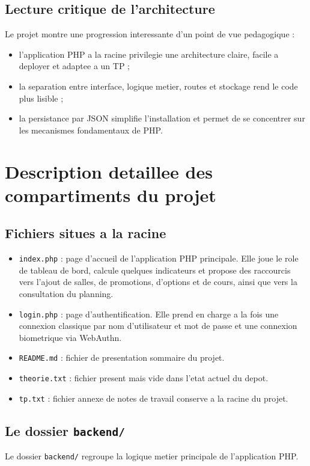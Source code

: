 \documentclass[12pt,a4paper]{article}
\begin{document}
\subsection{Lecture critique de l'architecture}
Le projet montre une progression interessante d'un point de vue pedagogique :
\begin{itemize}
    \item l'application PHP a la racine privilegie une architecture claire, facile a deployer et adaptee a un TP ;
    \item la separation entre interface, logique metier, routes et stockage rend le code plus lisible ;
    \item la persistance par JSON simplifie l'installation et permet de se concentrer sur les mecanismes fondamentaux de PHP.
\end{itemize}

\section{Description detaillee des compartiments du projet}
\subsection{Fichiers situes a la racine}
\begin{itemize}
    \item \texttt{index.php} : page d'accueil de l'application PHP principale. Elle joue le role de tableau de bord, calcule quelques indicateurs et propose des raccourcis vers l'ajout de salles, de promotions, d'options et de cours, ainsi que vers la consultation du planning.
    \item \texttt{login.php} : page d'authentification. Elle prend en charge a la fois une connexion classique par nom d'utilisateur et mot de passe et une connexion biometrique via WebAuthn.
    \item \texttt{README.md} : fichier de presentation sommaire du projet.
    \item \texttt{theorie.txt} : fichier present mais vide dans l'etat actuel du depot.
    \item \texttt{tp.txt} : fichier annexe de notes de travail conserve a la racine du projet.
\end{itemize}

\subsection{Le dossier \texttt{backend/}}
Le dossier \texttt{backend/} regroupe la logique metier principale de l'application PHP.
\end{document}
